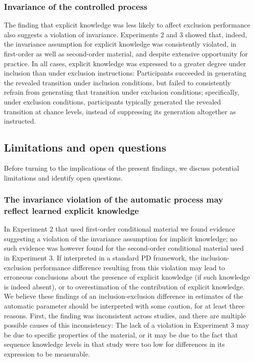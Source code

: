 \documentclass[english,,man]{apa6}
\begin{document}
\hypertarget{invariance-of-the-controlled-process}{%
\subsubsection{Invariance of the controlled process}\label{invariance-of-the-controlled-process}}

The finding that explicit knowledge was less likely to affect exclusion performance also suggests a violation of invariance.
Experiments 2 and 3 showed that, indeed, the invariance assumption for explicit knowledge was consistently violated, in first-order as well as second-order material, and despite extensive opportunity for practice.
In all cases, explicit knowledge was expressed to a greater degree under inclusion than under exclusion instructions:
Participants succeeded in generating the revealed transition under inclusion conditions, but failed to consistently refrain from generating that transition under exclusion conditions;
specifically, under exclusion conditions, participants typically generated the revealed transition at chance levels, instead of suppressing its generation altogether as instructed.

\hypertarget{limitations-and-open-questions}{%
\subsection{Limitations and open questions}\label{limitations-and-open-questions}}

Before turning to the implications of the present findings, we discuss potential limitations and identify open questions.

\hypertarget{the-invariance-violation-of-the-automatic-process-may-reflect-learned-explicit-knowledge}{%
\subsubsection{The invariance violation of the automatic process may reflect learned explicit knowledge}\label{the-invariance-violation-of-the-automatic-process-may-reflect-learned-explicit-knowledge}}

In Experiment 2 that used first-order conditional material we found evidence suggesting a violation of the invariance assumption for implicit knowledge;
no such evidence was however found for the second-order conditional material used in Experiment 3.
If interpreted in a standard PD framework, the inclusion-exclusion performance difference resulting from this violation may lead to erroneous conclusions about the presence of explicit knowledge (if such knowledge is indeed absent), or to overestimation of the contribution of explicit knowledge.
We believe these findings of an inclusion-exclusion difference in estimates of the automatic parameter should be interpreted with some caution, for at least three reasons.
First, the finding was inconsistent across studies, and there are multiple possible causes of this inconsistency:
The lack of a violation in Experiment 3 may be due to specific properties of the material, or it may be due to the fact that sequence knowledge levels in that study were too low for differences in its expression to be measurable.
\end{document}

